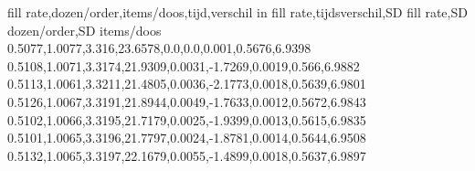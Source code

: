 fill rate,dozen/order,items/doos,tijd,verschil in fill rate,tijdsverschil,SD fill rate,SD dozen/order,SD items/doos
0.5077,1.0077,3.316,23.6578,0.0,0.0,0.001,0.5676,6.9398
0.5108,1.0071,3.3174,21.9309,0.0031,-1.7269,0.0019,0.566,6.9882
0.5113,1.0061,3.3211,21.4805,0.0036,-2.1773,0.0018,0.5639,6.9801
0.5126,1.0067,3.3191,21.8944,0.0049,-1.7633,0.0012,0.5672,6.9843
0.5102,1.0066,3.3195,21.7179,0.0025,-1.9399,0.0013,0.5615,6.9835
0.5101,1.0065,3.3196,21.7797,0.0024,-1.8781,0.0014,0.5644,6.9508
0.5132,1.0065,3.3197,22.1679,0.0055,-1.4899,0.0018,0.5637,6.9897
